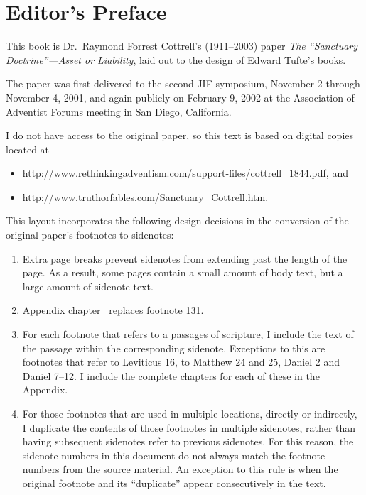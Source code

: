 \chapter*{Editor's Preface}
\label{ch:editor}

\begin{fullwidth}
This book is Dr.\ Raymond Forrest Cottrell's (1911--2003) paper \textit{The ``Sanctuary Doctrine''---Asset 
or Liability}, laid out to the design of Edward Tufte's books.  

The paper was first delivered to the second JIF symposium, November 2 through 
November 4, 2001, and again publicly on February 9, 2002 at the Association of 
Adventist Forums meeting in San Diego, California.

I do not have access to the original paper, so this text is based on digital copies
located at
\begin{itemize}
    \item \url{http://www.rethinkingadventism.com/support-files/cottrell_1844.pdf}, and
    \item \url{http://www.truthorfables.com/Sanctuary_Cottrell.htm}.
\end{itemize}

This layout incorporates the following design decisions in the conversion of
the original paper's footnotes to sidenotes:
\begin{enumerate}
    \item Extra page breaks prevent sidenotes from extending past the 
    length of the page. As a result, some pages contain a small amount of body
    text, but a large amount of sidenote text.
    \item Appendix chapter~ replaces footnote 131.
    \item For each footnote that refers to a passages of scripture, I include
    the text of the passage within the corresponding sidenote.  Exceptions
    to this are footnotes that refer to Leviticus 16, to Matthew 24 and 25,
    Daniel 2 and Daniel 7--12. I include the complete chapters for each
    of these in the Appendix.
    \item For those footnotes that are used in multiple locations, directly or 
    indirectly, I duplicate the contents of those footnotes in 
    multiple sidenotes, rather than having subsequent sidenotes refer to
    previous sidenotes. For this reason, the sidenote numbers in this document
    do not always match the footnote numbers from the source material.
    An exception to this rule is when the original
    footnote and its ``duplicate'' appear consecutively in the text.
\end{enumerate}


\end{fullwidth}
